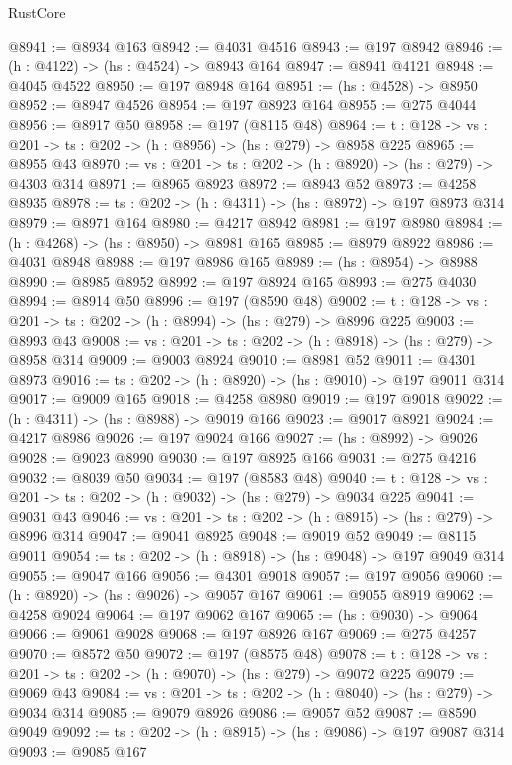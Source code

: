 \begin{lexlean}{RustCore}
\begin{coremodule}
@8941 := @8934 @163
@8942 := @4031 @4516
@8943 := @197 @8942
@8946 := (h : @4122) -> (hs : @4524) -> @8943 @164
@8947 := @8941 @4121
@8948 := @4045 @4522
@8950 := @197 @8948 @164
@8951 := (hs : @4528) -> @8950
@8952 := @8947 @4526
@8954 := @197 @8923 @164
@8955 := @275 @4044
@8956 := @8917 @50
@8958 := @197 (@8115 @48)
@8964 := {t : @128} -> {vs : @201} -> {ts : @202} -> (h : @8956) -> (hs : @279) -> @8958 @225
@8965 := @8955 @43
@8970 := {vs : @201} -> {ts : @202} -> (h : @8920) -> (hs : @279) -> @4303 @314
@8971 := @8965 @8923
@8972 := @8943 @52
@8973 := @4258 @8935
@8978 := {ts : @202} -> (h : @4311) -> (hs : @8972) -> @197 @8973 @314
@8979 := @8971 @164
@8980 := @4217 @8942
@8981 := @197 @8980
@8984 := (h : @4268) -> (hs : @8950) -> @8981 @165
@8985 := @8979 @8922
@8986 := @4031 @8948
@8988 := @197 @8986 @165
@8989 := (hs : @8954) -> @8988
@8990 := @8985 @8952
@8992 := @197 @8924 @165
@8993 := @275 @4030
@8994 := @8914 @50
@8996 := @197 (@8590 @48)
@9002 := {t : @128} -> {vs : @201} -> {ts : @202} -> (h : @8994) -> (hs : @279) -> @8996 @225
@9003 := @8993 @43
@9008 := {vs : @201} -> {ts : @202} -> (h : @8918) -> (hs : @279) -> @8958 @314
@9009 := @9003 @8924
@9010 := @8981 @52
@9011 := @4301 @8973
@9016 := {ts : @202} -> (h : @8920) -> (hs : @9010) -> @197 @9011 @314
@9017 := @9009 @165
@9018 := @4258 @8980
@9019 := @197 @9018
@9022 := (h : @4311) -> (hs : @8988) -> @9019 @166
@9023 := @9017 @8921
@9024 := @4217 @8986
@9026 := @197 @9024 @166
@9027 := (hs : @8992) -> @9026
@9028 := @9023 @8990
@9030 := @197 @8925 @166
@9031 := @275 @4216
@9032 := @8039 @50
@9034 := @197 (@8583 @48)
@9040 := {t : @128} -> {vs : @201} -> {ts : @202} -> (h : @9032) -> (hs : @279) -> @9034 @225
@9041 := @9031 @43
@9046 := {vs : @201} -> {ts : @202} -> (h : @8915) -> (hs : @279) -> @8996 @314
@9047 := @9041 @8925
@9048 := @9019 @52
@9049 := @8115 @9011
@9054 := {ts : @202} -> (h : @8918) -> (hs : @9048) -> @197 @9049 @314
@9055 := @9047 @166
@9056 := @4301 @9018
@9057 := @197 @9056
@9060 := (h : @8920) -> (hs : @9026) -> @9057 @167
@9061 := @9055 @8919
@9062 := @4258 @9024
@9064 := @197 @9062 @167
@9065 := (hs : @9030) -> @9064
@9066 := @9061 @9028
@9068 := @197 @8926 @167
@9069 := @275 @4257
@9070 := @8572 @50
@9072 := @197 (@8575 @48)
@9078 := {t : @128} -> {vs : @201} -> {ts : @202} -> (h : @9070) -> (hs : @279) -> @9072 @225
@9079 := @9069 @43
@9084 := {vs : @201} -> {ts : @202} -> (h : @8040) -> (hs : @279) -> @9034 @314
@9085 := @9079 @8926
@9086 := @9057 @52
@9087 := @8590 @9049
@9092 := {ts : @202} -> (h : @8915) -> (hs : @9086) -> @197 @9087 @314
@9093 := @9085 @167

\end{coremodule}
\end{lexlean}
